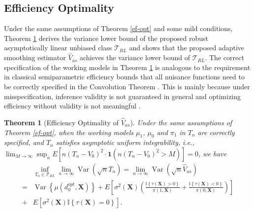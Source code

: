 \documentclass[11pt]{article}
\theoremstyle{referenceplain}
\newtheorem{theorem}{Theorem}
\theoremstyle{referencedefinition}
\theoremstyle{referenceremark}
\begin{document}
\subsection{Efficiency Optimality}
Under the same assumptions of Theorem \ref{ef-opt} and some mild conditions, Theorem \ref{opt-ralu} derives the variance lower bound of the proposed robust asymptotically linear unbiased class $\mathcal{T}_{RL}$ and shows that the proposed adaptive smoothing estimator $\widehat{V}_{as}$ achieves the variance lower bound of $\mathcal{T}_{RL}$. The correct specification of the working models in Theorem \ref{opt-ralu} is analogous to the requirement in classical semiparametric efficiency bounds that all nuisance functions need to be correctly specified in the Convolution Theorem \citep{bickel1993efficient}. This is mainly because under misspecification, inference validity is not guaranteed in general and optimizing efficiency without validity is not meaningful \citep{tsiatis2006semiparametric}.

\begin{theorem}[Efficiency Optimality of $\widehat{V}_{as}$] \label{opt-ralu}
Under the same assumptions of Theorem \ref{ef-opt}, when the working models $\mu_1$, $\mu_0$ and $\pi_1$ in $T_n$ are correctly specified, and $T_n$ satisfies asymptotic uniform integrability, i.e., $ \lim _{M \rightarrow \infty} \sup _n E\left[n\left(T_n-V_0\right)^2 \cdot \mathbf{1}\left(n\left(T_n-V_0\right)^2>M\right)\right]=0$, we have
    \begin{align*}
        &\inf_{T_n\in\mathcal{T}_{RL}}\lim_{n\to\infty}\operatorname{Var}(\sqrt{n}T_n)= \lim_{n\to\infty}\operatorname{Var}(\sqrt{n}\widehat{V}_{as})\\
         =&\operatorname{Var}\left\{\mu\left(d_0^{o p t}, \mathbf{X}\right)\right\} + E\left[{\sigma^2(\mathbf{X})}\left(\frac{\mathbb{I}\left\{\tau\left(\mathbf{X}\right)>0\right\}}{\pi\left(1, \mathbf{X}\right)}+\frac{\mathbb{I}\left\{\tau\left(\mathbf{X}\right)<0\right\}}{\pi\left(0, \mathbf{X}\right)}\right)\right]\\
    +& E\left[{\sigma^2(\mathbf{X})} \mathbb{I}\left\{\tau\left(\mathbf{X}\right)=0\right\}\right].
    \end{align*}
\end{theorem}
\end{document}
